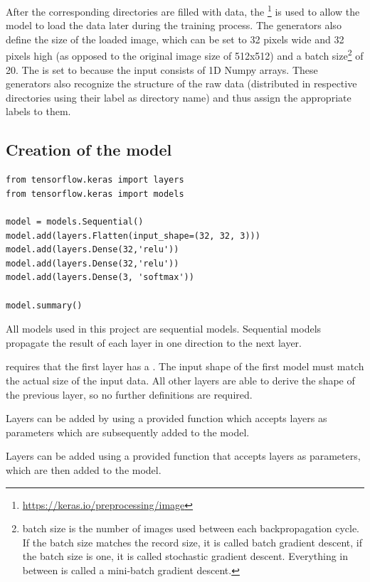 After the corresponding directories are filled with data, the \footnote{\url{https://keras.io/preprocessing/image}} is used to allow the model to load the data later during the training process.
The generators also define the size of the loaded image, which can be set to 32 pixels wide and 32 pixels high (as opposed to the original image size of 512x512) and a batch size\footnote{batch size is the number of images used between each backpropagation cycle.
If the batch size matches the record size, it is called batch gradient descent, if the batch size is one, it is called stochastic gradient descent.
Everything in between is called a mini-batch gradient descent.} of 20.
The  is set to  because the input consists of 1D Numpy arrays.
These generators also recognize the structure of the raw data (distributed in respective directories using their label as directory name) and thus assign the appropriate labels to them.

\subsection{Creation of the model}

\begin{lstlisting}[label={lst:first_model}]
from tensorflow.keras import layers
from tensorflow.keras import models

model = models.Sequential()
model.add(layers.Flatten(input_shape=(32, 32, 3)))
model.add(layers.Dense(32,'relu'))
model.add(layers.Dense(32,'relu'))
model.add(layers.Dense(3, 'softmax'))

model.summary()
\end{lstlisting}

All models used in this project are sequential models.
Sequential models propagate the result of each layer in one direction to the next layer.

 requires that the first layer has a .
The input shape of the first model must match the actual size of the input data.
All other layers are able to derive the shape of the previous layer, so no further definitions are required.

Layers can be added by using a provided  function which accepts layers as parameters which are subsequently added to the model.

Layers can be added using a provided  function that accepts layers as parameters, which are then added to the model.

